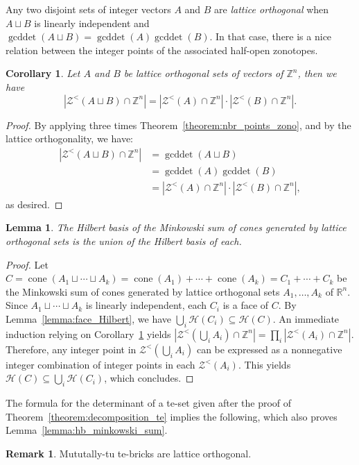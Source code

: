\documentclass[11pt,a4paper]{amsart}
\theoremstyle{plain}
\newtheorem{corollary}[theorem]{Corollary}
\newtheorem{lemma}[theorem]{Lemma}
\theoremstyle{definition}
\newtheorem{remark}[theorem]{Remark}
\newcommand{\cal}[1]{\mathcal{#1}}
\newcommand{\Z}{\mathbb{Z}}
\DeclareMathOperator{\cone}{cone}
\DeclareMathOperator{\gcddet}{gcddet}
\renewcommand{\cal}[1]{\mathcal{#1}}
\begin{document}
Any two disjoint sets of integer vectors $A$ and $B$ are \emph{lattice orthogonal} when $A\sqcup B$ is linearly independent and $\gcddet(A\sqcup B) = \gcddet(A)\gcddet(B)$.
In that case, there is a nice relation between the integer points of the associated half-open zonotopes.
\begin{corollary}\label{corollary:mutually_tu}
Let $A$ and $B$ be lattice orthogonal sets of vectors of $\Z^n$, then we have
$$|\cal Z^<(A\sqcup B)\cap \Z^n| =|\cal Z^<(A)\cap \Z^n|\cdot|\cal Z^<(B)\cap \Z^n|.$$
\end{corollary}
\begin{proof}
By applying three times Theorem~\ref{theorem:nbr_points_zono}, and by the lattice orthogonality, we have: 
\begin{align*}
|\cal Z^<(A\sqcup B)\cap \Z^n| &= \gcddet(A\sqcup B)\\
&=  \gcddet(A)\gcddet(B) \\
&= |\cal Z^<(A)\cap \Z^n|\cdot|\cal Z^<(B)\cap \Z^n|,
\end{align*} as desired.
\end{proof}

\begin{lemma}\label{lemma:hb_lattice_orthogonal}
The Hilbert basis of the Minkowski sum of cones generated by lattice orthogonal sets is the union of the Hilbert basis of each.
\end{lemma}
\begin{proof}
Let $C = \cone(A_1\sqcup \cdots\sqcup A_k) = \cone(A_1)+\cdots+\cone(A_k) = C_1+\cdots+C_k$ be the Minkowski sum of cones generated by lattice orthogonal sets $A_1,\ldots,A_k$ of $\mathbb{R}^n$.
Since $A_1\sqcup \cdots\sqcup A_k$ is linearly independent, each $C_i$ is a face of $C$.
By Lemma~\ref{lemma:face_Hilbert}, we have $\bigcup_i \cal H(C_i)\subseteq\cal H(C)$. An immediate induction relying on Corollary~\ref{corollary:mutually_tu} yields $|\cal Z^<(\bigcup_i A_i)\cap \Z^n|=\prod_i|\cal Z^<(A_i)\cap \Z^n|$.
Therefore, any integer point in $\cal Z^<(\bigcup_i A_i)$ can be expressed as a nonnegative integer combination of integer points in each $\cal Z^<(A_i)$. 
This yields $\cal H(C)\subseteq \bigcup_i \cal H(C_i)$, which concludes.
\end{proof}
The formula for the determinant of a te-set given after the proof of Theorem~\ref{theorem:decomposition_te} implies the following, which also proves Lemma~\ref{lemma:hb_minkowski_sum}.	
\begin{remark}\label{remark:mutually-tu}
Mututally-tu te-bricks are lattice orthogonal.
\end{remark}
\medskip
\end{document}
